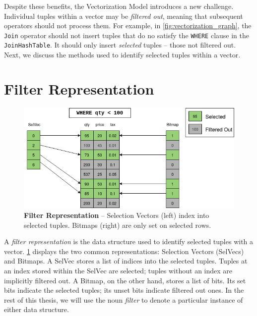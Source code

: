\documentclass[12pt]{cmuthesis}
\begin{document}
Despite these benefits, the Vectorization Model introduces a new challenge. Individual tuples within a vector may be \textit{filtered out}, meaning that subsequent operators should not process them. For example, in \cref{fig:vectorization_graph}, the \texttt{Join} operator should not insert tuples that do no satisfy the \texttt{WHERE} clause in the \texttt{JoinHashTable}. It should only insert \textit{selected} tuples -- those not filtered out. Next, we discuss the methods used to identify selected tuples within a vector.

\section{Filter Representation}
\begin{figure}[t!]
    \centering
    \includegraphics[scale=0.7]{images/FilterRepresentationIntro.png}
    \caption{\textbf{Filter Representation} -- Selection Vectors (left) index into selected tuples. Bitmaps (right) are only set on selected rows.}
    \label{fig:repr_intro}
\end{figure}

A \textit{filter representation} is the data structure used to identify selected tuples with a vector. \cref{fig:repr_intro} displays the two common representations: Selection Vectors (SelVecs) and Bitmaps. A SelVec stores a list of indices into the selected tuples. Tuples at an index stored within the SelVec are selected; tuples without an index are implicitly filtered out. A Bitmap, on the other hand, stores a list of bits. Its set bits indicate the selected tuples; its unset bits indicate filtered out ones. In the rest of this thesis, we will use the noun \textit{filter} to denote a particular instance of either data structure.
\end{document}

